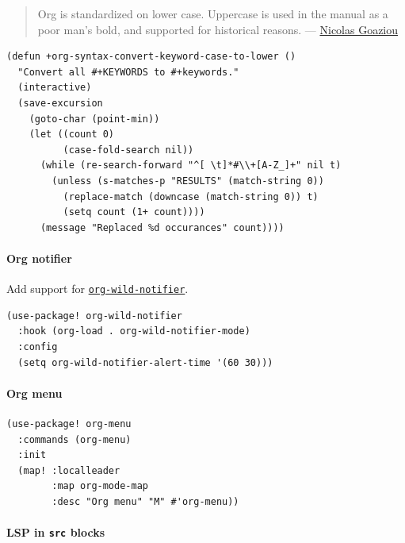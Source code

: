 \documentclass[11pt]{article}
\begin{document}
\begin{quote}
Org is standardized on lower case. Uppercase is used in the manual as a poor
man's bold, and supported for historical reasons. --- \href{https://orgmode.org/list/87tuuw3n15.fsf@nicolasgoaziou.fr}{Nicolas Goaziou}
\end{quote}

\begin{verbatim}
(defun +org-syntax-convert-keyword-case-to-lower ()
  "Convert all #+KEYWORDS to #+keywords."
  (interactive)
  (save-excursion
    (goto-char (point-min))
    (let ((count 0)
          (case-fold-search nil))
      (while (re-search-forward "^[ \t]*#\\+[A-Z_]+" nil t)
        (unless (s-matches-p "RESULTS" (match-string 0))
          (replace-match (downcase (match-string 0)) t)
          (setq count (1+ count))))
      (message "Replaced %d occurances" count))))
\end{verbatim}

\paragraph{Org notifier}
\label{sec:orgb7ebb14}
Add support for \href{https://github.com/akhramov/org-wild-notifier.el}{\texttt{org-wild-notifier}}.

\begin{verbatim}
(use-package! org-wild-notifier
  :hook (org-load . org-wild-notifier-mode)
  :config
  (setq org-wild-notifier-alert-time '(60 30)))
\end{verbatim}

\paragraph{Org menu}
\label{sec:org37ee736}

\begin{verbatim}
(use-package! org-menu
  :commands (org-menu)
  :init
  (map! :localleader
        :map org-mode-map
        :desc "Org menu" "M" #'org-menu))
\end{verbatim}

\paragraph{LSP in \texttt{src} blocks}
\label{sec:orgc2786c5}
\end{document}
